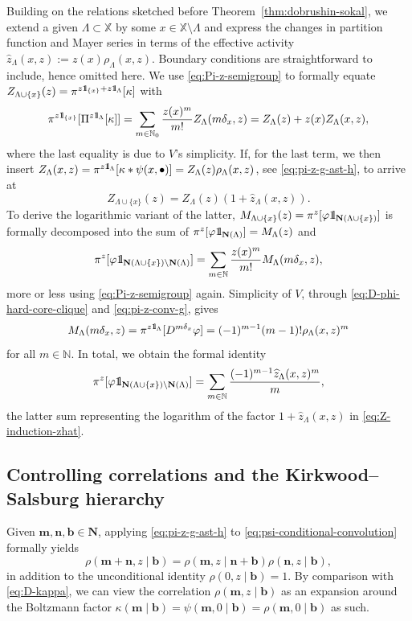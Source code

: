\documentclass[10pt,a4paper]{amsart}
\newcommand{\N}{\mathbb{N}}
\newcommand{\X}{\mathbb X}
\newcommand{\be}{\begin{equation}}
\newcommand{\ee}{\end{equation}}
\def\1{{\mathchoice {1\mskip-4mu\mathrm l}      
{1\mskip-4mu\mathrm l}
{1\mskip-4.5mu\mathrm l} {1\mskip-5mu\mathrm l}}}
\begin{document}
Building on the relations sketched before Theorem~\ref{thm:dobrushin-sokal}, we extend a given $\Lambda \subset \X$ by some $x \in \X \setminus \Lambda$ and express the changes in partition function and Mayer series in terms of the effective activity $\widehat z_\Lambda(x, z) := z(x) \rho_\Lambda(x, z)$. 
Boundary conditions are straightforward to include, hence omitted here. 
We use \eqref{eq:Pi-z-semigroup} to formally equate $Z_{\Lambda \cup \{x\}}(z) = \pi^{z \1_{\{x\}} + z \1_\Lambda}[\kappa]$ with
\[
	\pi^{z \1_{\{x\}}}[\Pi^{z \1_\Lambda}[\kappa]] = \sum_{m \in \N_0} \frac{z(x)^m}{m!} Z_\Lambda(m \delta_x, z) = Z_\Lambda(z) + z(x) Z_\Lambda(x, z),
\]
where the last equality is due to $V$'s simplicity. 
If, for the last term, we then insert $Z_\Lambda(x, z) = \pi^{z \1_\Lambda}[\kappa \ast \psi(x, \bullet)] = Z_\Lambda(z) \rho_\Lambda(x, z)$, see \eqref{eq:pi-z-g-ast-h}, to arrive at
\be \label{eq:Z-induction-zhat}
	Z_{\Lambda \cup \{x\}}(z) = Z_\Lambda(z) (1 + \widehat z_\Lambda(x, z)).
\ee
To derive the logarithmic variant of the latter, $M_{\Lambda \cup \{x\}}(z) = \pi^z[\varphi \1_{\mathbf N(\Lambda \cup \{x\})}]$ is formally decomposed into the sum of $\pi^z[\varphi \1_{\mathbf N(\Lambda)}] = M_\Lambda(z)$ and
\[
	\pi^z[\varphi \1_{\mathbf N(\Lambda \cup \{x\}) \setminus \mathbf N(\Lambda)}] = \sum_{m \in \N} \frac{z(x)^m}{m!} M_\Lambda(m \delta_x, z),
\]
more or less using \eqref{eq:Pi-z-semigroup} again. 
Simplicity of $V$, through \eqref{eq:D-phi-hard-core-clique} and \eqref{eq:pi-z-conv-g}, gives
\[
	M_\Lambda(m \delta_x, z) = \pi^{z \1_\Lambda}[D^{m \delta_x} \varphi] = (-1)^{m-1} (m-1)! \rho_\Lambda(x, z)^m
\]
for all $m \in \N$. 
In total, we obtain the formal identity
\be \label{eq:M-induction-zhat}
	\pi^z[\varphi \1_{\mathbf N(\Lambda \cup \{x\}) \setminus \mathbf N(\Lambda)}] = \sum_{m \in \N} \frac{(-1)^{m-1} \widehat z_\Lambda(x, z)^m}{m},
\ee
the latter sum representing the logarithm of the factor $1 + \widehat z_\Lambda(x, z)$ in \eqref{eq:Z-induction-zhat}.

\subsection{Controlling correlations and the Kirkwood--Salsburg hierarchy}

Given $\mathbf m, \mathbf n, \mathbf b \in \mathbf N$, applying \eqref{eq:pi-z-g-ast-h} to \eqref{eq:psi-conditional-convolution} formally yields
\be \label{eq:D-rho}
	\rho(\mathbf m + \mathbf n, z \mid \mathbf b) = \rho(\mathbf m, z \mid \mathbf n + \mathbf b) \rho(\mathbf n, z \mid \mathbf b),
\ee
in addition to the unconditional identity $\rho(0, z \mid \mathbf b) = 1$. 
By comparison with \eqref{eq:D-kappa}, we can view the correlation $\rho(\mathbf m, z \mid \mathbf b)$ as an expansion around the Boltzmann factor $\kappa(\mathbf m \mid \mathbf b) = \psi(\mathbf m, 0 \mid \mathbf b) = \rho(\mathbf m, 0 \mid \mathbf b)$ as such.
\end{document}
